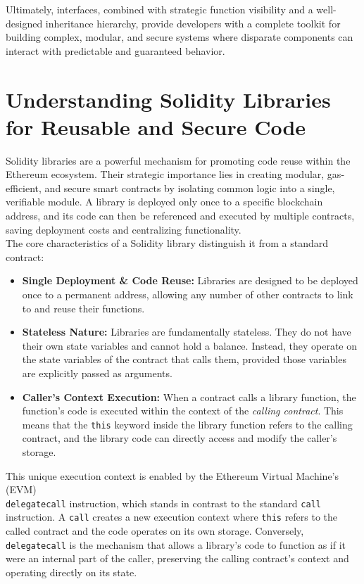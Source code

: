 \documentclass{scrbook}
\begin{document}
Ultimately, interfaces, combined with strategic function visibility and a well-designed inheritance hierarchy, provide developers with a complete toolkit for building complex, modular, and secure systems where disparate components can interact with predictable and guaranteed behavior.

\chapter{Understanding Solidity Libraries for Reusable and Secure Code}

Solidity libraries are a powerful mechanism for promoting code reuse within the Ethereum ecosystem. Their strategic importance lies in creating modular, gas-efficient, and secure smart contracts by isolating common logic into a single, verifiable module. A library is deployed only once to a specific blockchain address, and its code can then be referenced and executed by multiple contracts, saving deployment costs and centralizing functionality.\\

The core characteristics of a Solidity library distinguish it from a standard contract:

\begin{itemize}
    \item \textbf{Single Deployment \& Code Reuse:} Libraries are designed to be deployed once to a permanent address, allowing any number of other contracts to link to and reuse their functions.
    
    \item \textbf{Stateless Nature:} Libraries are fundamentally stateless. They do not have their own state variables and cannot hold a balance. Instead, they operate on the state variables of the contract that calls them, provided those variables are explicitly passed as arguments.
    
    \item \textbf{Caller's Context Execution:} When a contract calls a library function, the function's code is executed within the context of the \textit{calling contract}. This means that the \texttt{this} keyword inside the library function refers to the calling contract, and the library code can directly access and modify the caller's storage.
\end{itemize}

This unique execution context is enabled by the Ethereum Virtual Machine's (EVM) \\
\texttt{delegatecall} instruction, which stands in contrast to the standard \texttt{call} instruction. A \texttt{call} creates a new execution context where \texttt{this} refers to the called contract and the code operates on its own storage. Conversely, \texttt{delegatecall} is the mechanism that allows a library's code to function as if it were an internal part of the caller, preserving the calling contract's context and operating directly on its state.\\
\end{document}
